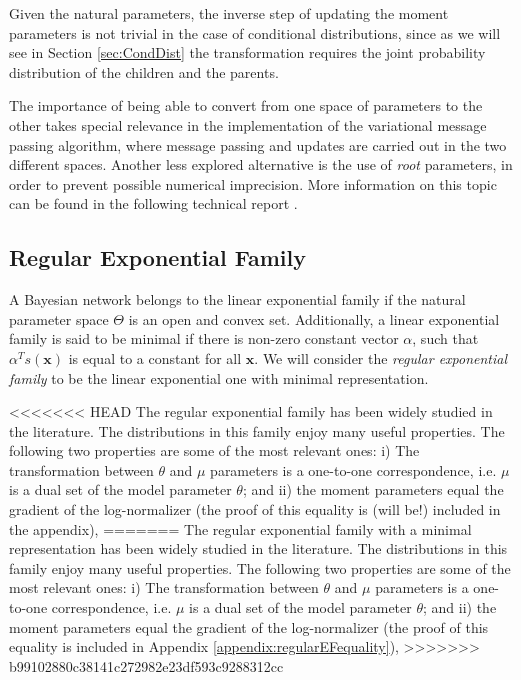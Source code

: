 \documentclass[11pt, oneside]{article}   	%
\newcommand{\bm}{\mathbf}
\numberwithin{figure}{section}
\numberwithin{equation}{section}
\numberwithin{table}{section}
\theoremstyle{definition}
\begin{document}
Given the natural parameters, the inverse step of updating the moment parameters is not trivial in the case of conditional distributions, since as we will see in Section \ref{sec:CondDist} the transformation requires the joint probability distribution of the children and the parents. 

The importance of being able to convert from one space of parameters to the other takes special relevance in the implementation of the variational message passing algorithm, where message passing and updates are carried out in the two different spaces. Another less explored alternative is the use of \textit{root} parameters, in order to prevent possible numerical imprecision. More information on this topic can be found in the following technical report \cite{HowJeb05}.

\subsection*{Regular Exponential Family}

A Bayesian network belongs to the linear exponential family if the natural parameter space $\Theta$ is an open and convex set. Additionally, a linear exponential family is said to be minimal if there is non-zero constant vector $\alpha$, such that $\alpha^Ts(\bm x)$ is equal to a constant for all $\bm x$.  We will consider the \textit{regular exponential family} to be the linear exponential one with minimal representation.


<<<<<<< HEAD
The regular exponential family has been widely studied in the literature. The distributions in this family enjoy many useful properties. The following two properties are some of the most relevant ones: i)  The transformation between $\theta$ and $\mu$ parameters is a one-to-one correspondence, i.e. $\mu$ is a dual set of the model parameter $\theta$; and ii) the moment parameters equal the gradient of the log-normalizer (the proof of this equality is (will be!) included in the appendix), 
=======
The regular exponential family with a minimal representation has been widely studied in the literature. The distributions in this family enjoy many useful properties. The following two properties are some of the most relevant ones: i)  The transformation between $\theta$ and $\mu$ parameters is a one-to-one correspondence, i.e. $\mu$ is a dual set of the model parameter $\theta$; and ii) the moment parameters equal the gradient of the log-normalizer (the proof of this equality is included in Appendix \ref{appendix:regularEFequality}), 
>>>>>>> b99102880c38141c272982e23df593c9288312cc
\end{document}

